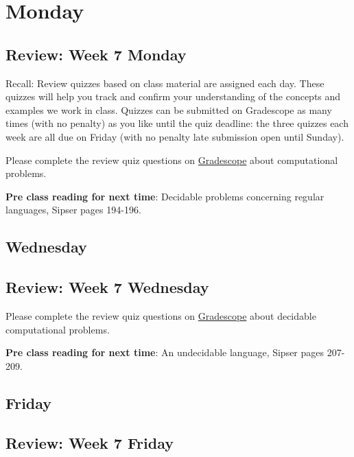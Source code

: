 \newpage

\section*{Monday}


    
\newpage
\subsection*{Review: Week 7 Monday}


Recall: Review quizzes based on class material are assigned each day. 
These quizzes will help you track and confirm your understanding of the concepts and examples 
we work in class. Quizzes can be submitted on Gradescope as many times (with no penalty) as 
you like until the quiz deadline: the three quizzes each week are all due on Friday (with no penalty 
late submission open until Sunday).

Please complete the review quiz questions on \href{http://gradescope.com}{Gradescope} about 
computational problems.

{\bf Pre class reading for next time}: Decidable problems concerning regular languages, Sipser pages 194-196.


\newpage
\subsection*{Wednesday}



\subsection*{Review: Week 7 Wednesday}

Please complete the review quiz questions on \href{http://gradescope.com}{Gradescope} about 
decidable computational problems.

{\bf Pre class reading for next time}: An undecidable language, Sipser pages 207-209.



\newpage
\subsection*{Friday}



\newpage
\subsection*{Review: Week 7 Friday}


